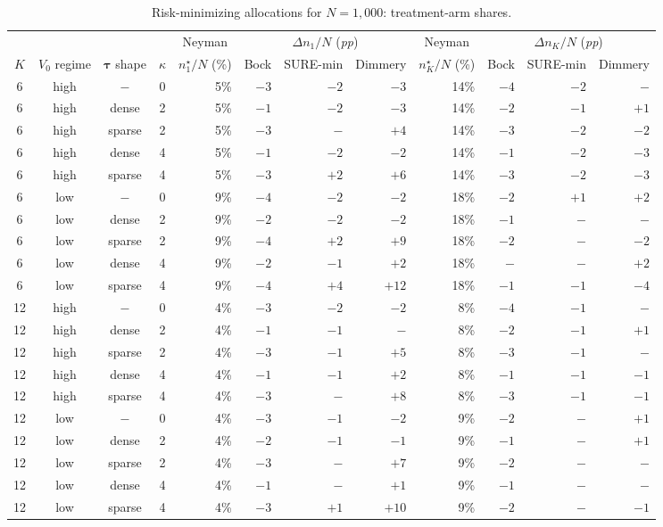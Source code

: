 \documentclass{article}
\newcommand{\bstau}{\boldsymbol \tau}
\begin{document}
\begin{table}[ht]
\centering
\begin{threeparttable}
\caption{Risk-minimizing allocations for $N = 1{,}000$: treatment-arm shares.}
\label{tab:simAll_treat1}

\small
\setlength{\tabcolsep}{4pt}

\begin{tabular}{ccccrrrrrrrr}
\toprule
& & & &
\multicolumn{1}{c}{Neyman}
& \multicolumn{3}{c}{$\Delta n_1/N$ (\textit{pp})}
& \multicolumn{1}{c}{Neyman}
& \multicolumn{3}{c}{$\Delta n_K/N$ (\textit{pp})} \\
\cmidrule(lr){6-8} \cmidrule(lr){10-12}
$K$ & $V_0$ regime & $\bstau$ shape & $\kappa$
& $n_1^\star/N$ (\%)
& Bock & SURE-min & Dimmery
& $n_K^\star/N$ (\%)
& Bock & SURE-min & Dimmery \\
\midrule
6 & high & $-$ & 0 & 5\% & $-3$ & $-2$ & $-3$ & 14\% & $-4$ & $-2$ & $-$ \\
6 & high & dense & 2 & 5\% & $-1$ & $-2$ & $-3$ & 14\% & $-2$ & $-1$ & $+1$ \\
6 & high & sparse & 2 & 5\% & $-3$ & $-$ & $+4$ & 14\% & $-3$ & $-2$ & $-2$ \\
6 & high & dense & 4 & 5\% & $-1$ & $-2$ & $-2$ & 14\% & $-1$ & $-2$ & $-3$ \\
6 & high & sparse & 4 & 5\% & $-3$ & $+2$ & $+6$ & 14\% & $-3$ & $-2$ & $-3$ \\
\midrule
6 & low & $-$ & 0 & 9\% & $-4$ & $-2$ & $-2$ & 18\% & $-2$ & $+1$ & $+2$ \\
6 & low & dense & 2 & 9\% & $-2$ & $-2$ & $-2$ & 18\% & $-1$ & $-$ & $-$ \\
6 & low & sparse & 2 & 9\% & $-4$ & $+2$ & $+9$ & 18\% & $-2$ & $-$ & $-2$ \\
6 & low & dense & 4 & 9\% & $-2$ & $-1$ & $+2$ & 18\% & $-$ & $-$ & $+2$ \\
6 & low & sparse & 4 & 9\% & $-4$ & $+4$ & $+12$ & 18\% & $-1$ & $-1$ & $-4$ \\
\midrule
12 & high & $-$ & 0 & 4\% & $-3$ & $-2$ & $-2$ & 8\% & $-4$ & $-1$ & $-$ \\
12 & high & dense & 2 & 4\% & $-1$ & $-1$ & $-$ & 8\% & $-2$ & $-1$ & $+1$ \\
12 & high & sparse & 2 & 4\% & $-3$ & $-1$ & $+5$ & 8\% & $-3$ & $-1$ & $-$ \\
12 & high & dense & 4 & 4\% & $-1$ & $-1$ & $+2$ & 8\% & $-1$ & $-1$ & $-1$ \\
12 & high & sparse & 4 & 4\% & $-3$ & $-$ & $+8$ & 8\% & $-3$ & $-1$ & $-1$ \\
\midrule
12 & low & $-$ & 0 & 4\% & $-3$ & $-1$ & $-2$ & 9\% & $-2$ & $-$ & $+1$ \\
12 & low & dense & 2 & 4\% & $-2$ & $-1$ & $-1$ & 9\% & $-1$ & $-$ & $+1$ \\
12 & low & sparse & 2 & 4\% & $-3$ & $-$ & $+7$ & 9\% & $-2$ & $-$ & $-$ \\
12 & low & dense & 4 & 4\% & $-1$ & $-$ & $+1$ & 9\% & $-1$ & $-$ & $-$ \\
12 & low & sparse & 4 & 4\% & $-3$ & $+1$ & $+10$ & 9\% & $-2$ & $-$ & $-1$ \\
\bottomrule
\end{tabular}


\end{threeparttable}
\end{table}
\end{document}
